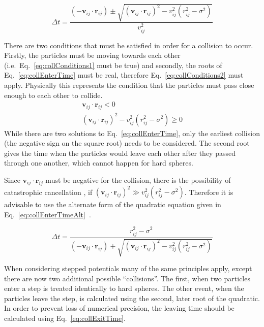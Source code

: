 \documentclass[12pt]{UoAthesis} \usepackage{booktabs}
\begin{document}
\begin{equation}
\Delta t = \frac{(-\mathbf{v}_{ij}\cdot\mathbf{r}_{ij}) \pm 
  \sqrt{(\mathbf{v}_{ij}\cdot\mathbf{r}_{ij})^2 - v_{ij}^2(r_{ij}^2 - \sigma^2)}}
       {v_{ij}^2} \label{eq:collEnterTime}
\end{equation}

There are two conditions that must be satisfied in order for a
collision to occur.  Firstly, the particles must be moving towards
each other (i.e.\ Eq.~\eqref{eq:collConditions1} must be true) and
secondly, the roots of Eq.~\eqref{eq:collEnterTime} must be real,
therefore Eq.~\eqref{eq:collConditions2} must apply. Physically this
represents the condition that the particles must pass close enough to
each other to collide.  
\begin{subequations}
  \begin{align}
    \mathbf{v}_{ij}\cdot\mathbf{r}_{ij} < 0 \label{eq:collConditions1}\\
    (\mathbf{v}_{ij}\cdot\mathbf{r}_{ij})^2 
    - v_{ij}^2(r_{ij}^2 - \sigma^2) \geq 0 \label{eq:collConditions2}
  \end{align}
\end{subequations}
While there are two solutions to Eq.~\eqref{eq:collEnterTime}, only
the earliest collision (the negative sign on the square root) needs to
be considered.  The second root gives the time when the particles
would leave each other after they passed through one another, which
cannot happen for hard spheres.

Since $\mathbf{v}_{ij}\cdot\mathbf{r}_{ij}$ must be negative for the
collision, there is the possibility of catastrophic cancellation
\cite{Goldberg1991}, if $(\mathbf{v}_{ij}\cdot\mathbf{r}_{ij})^2 \gg
v_{ij}^2(r_{ij}^2 - \sigma^2)$. Therefore it is advisable to use the
alternate form of the quadratic equation given in
Eq.~\eqref{eq:collEnterTimeAlt}~\cite{Poschel2005}.

\begin{equation}
\Delta t = \frac{r_{ij}^2 - \sigma^2}{(-\mathbf{v}_{ij}\cdot\mathbf{r}_{ij})
  + \sqrt{(\mathbf{v}_{ij}\cdot\mathbf{r}_{ij})^2 
    - v_{ij}^2(r_{ij}^2 - \sigma^2)}}
\label{eq:collEnterTimeAlt}
\end{equation}

When considering stepped potentials many of the same principles apply,
except there are now two additional possible ``collisions''. The first, when two
particles enter a step is treated identically to hard spheres. The
other event, when the particles leave the step, is calculated using
the second, later root of the quadratic.  In order to prevent loss of
numerical precision, the leaving time should be calculated using
Eq.~\eqref{eq:collExitTime}.
\end{document}

